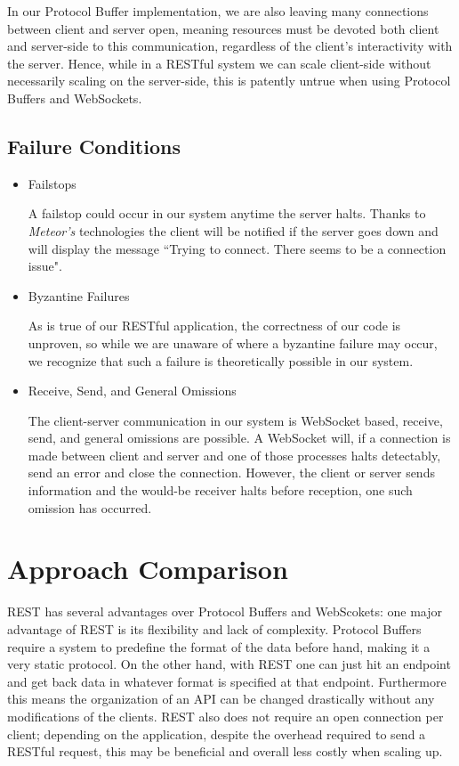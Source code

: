 \documentclass[11pt]{article} %
\begin{document}
In our Protocol Buffer implementation, we are also leaving many connections between client and server open, meaning resources must be devoted both client and server-side to this communication, regardless of the client's interactivity with the server. Hence, while in a RESTful system we can scale client-side without necessarily scaling on the server-side, this is patently untrue when using Protocol Buffers and WebSockets. 

\subsection{Failure Conditions}

\begin{itemize}
	\item Failstops
	
	A failstop could occur in our system anytime the server halts. Thanks to \textit{Meteor's} technologies the client will be notified if the server goes down and will display the message ``Trying to connect. There seems to be a connection issue".
	
	\item Byzantine Failures
	
	As is true of our RESTful application, the correctness of our code is unproven, so while we are unaware of where a byzantine failure may occur, we recognize that such a failure is theoretically possible in our system.
	
	\item Receive, Send, and General Omissions
	
	The client-server communication in our system is WebSocket based, receive, send, and general omissions are possible. A WebSocket will, if a connection is made between client and server and one of those processes halts detectably, send an error and close the connection. However, the client or server sends information and the would-be receiver halts before reception, one such omission has occurred. 
	
\end{itemize}	


\section{Approach Comparison} 

REST has several advantages over Protocol Buffers and WebScokets: one major advantage of REST is its flexibility and lack of complexity. Protocol Buffers require a system to predefine the format of the data before hand, making it a very static protocol. On the other hand, with REST one can just hit an endpoint and get back data in whatever format is specified at that endpoint. Furthermore this means the organization of an API can be changed drastically without any modifications of the clients. REST also does not require an open connection per client; depending on the application, despite the overhead required to send a RESTful request, this may be beneficial and overall less costly when scaling up. 
\end{document}

